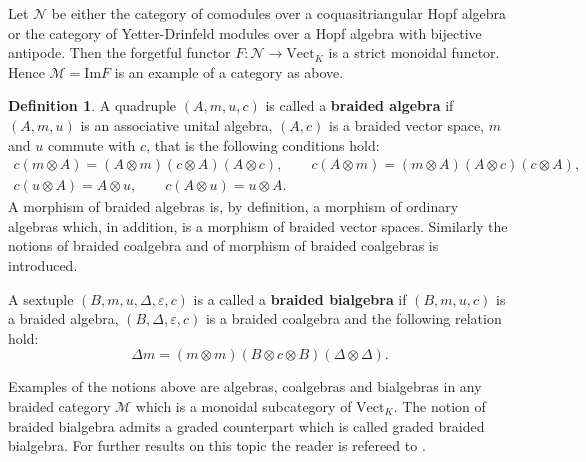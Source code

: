 \documentclass[english]{amsart}
\numberwithin{equation}{section}
\numberwithin{figure}{section}
\theoremstyle{plain}
\theoremstyle{definition}
\newtheorem{defn}[thm]{Definition}
\theoremstyle{definition}
\theoremstyle{remark}
\theoremstyle{remark}
\theoremstyle{plain}
\theoremstyle{plain}
\theoremstyle{plain}
\begin{document}
Let $\mathcal{N}$ be either the category of comodules over a coquasitriangular
Hopf algebra or the category of Yetter-Drinfeld modules over a Hopf
algebra with bijective antipode. Then the forgetful functor $F:\mathcal{N}\rightarrow\mathrm{Vect}_{K}$
is a strict monoidal functor. Hence $\mathcal{M}=\mathrm{Im}F$ is
an example of a category as above. 
\begin{defn}
\cite{Ba} A quadruple $(A,m,u,c)$ is called a \textbf{braided algebra}
if $(A,m,u)$ is an associative unital algebra, $(A,c)$ is a braided
vector space, $m$ and $u$ commute with $c$, that is the following
conditions hold:\begin{gather*}
c(m\otimes A)=(A\otimes m)(c\otimes A)(A\otimes c),\qquad c(A\otimes m)=(m\otimes A)\left(A\otimes c\right)(c\otimes A),\\
c(u\otimes A)=A\otimes u,\qquad c(A\otimes u)=u\otimes A.\end{gather*}
A morphism of braided algebras is, by definition, a morphism of ordinary
algebras which, in addition, is a morphism of braided vector spaces.
Similarly the notions of braided coalgebra and of morphism of braided
coalgebras is introduced. 

\cite[Definition 5.1]{Ta} A sextuple $(B,m,u,\Delta,\varepsilon,c)$
is a called a \textbf{braided bialgebra} if $(B,m,u,c)$ is a braided
algebra, $(B,\Delta,\varepsilon,c)$ is a braided coalgebra and the
following relation hold:\[
\Delta m=(m\otimes m)(B\otimes c\otimes B)(\Delta\otimes\Delta).\]

\end{defn}
Examples of the notions above are algebras, coalgebras and bialgebras
in any braided category $\mathcal{M}$ which is a monoidal subcategory
of $\mathrm{Vect}_{K}$. The notion of braided bialgebra admits a
graded counterpart which is called graded braided bialgebra. For further
results on this topic the reader is refereed to \cite[1.8]{AMS-MM2}.
\end{document}
